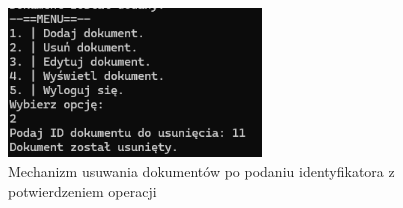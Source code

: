 \begin{figure}[htbp]
  \centering
  \includegraphics[width=0.6\textwidth]{usun.png}
  \caption{Mechanizm usuwania dokumentów po podaniu identyfikatora z potwierdzeniem operacji}
  \label{fig:usuwanie}
\end{figure}


